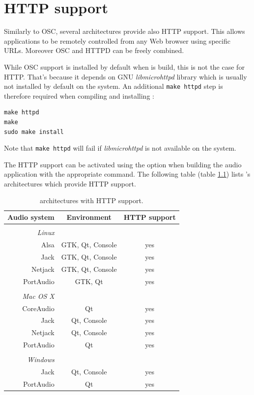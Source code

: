 \chapter{HTTP support} \label{sec:http}

Similarly to OSC, several \faust architectures provide also HTTP support. This allows \faust applications to be remotely controlled from any Web browser using specific URLs. Moreover OSC and HTTPD can be freely combined.

While OSC support is installed by default when \faust is build, this is not the case for HTTP. That's because it depends on GNU \emph{libmicrohttpd} library which is usually not installed by default on the system. An additional \lstinline'make httpd' step is therefore required when compiling and installing \faust:
\begin{lstlisting}
make httpd
make
sudo make install
\end{lstlisting}
Note that \lstinline'make httpd' will fail if \emph{libmicrohttpd} is not available on the system.

The HTTP support can be activated using the  option when building the audio application with the appropriate  command. The following table (table \ref{tab:httparch}) lists \faust's architectures which provide HTTP support. 

\begin{table}[htdp]
\begin{center}
\begin{tabular}{rcc}
\hline
\bf{Audio system} 	& \bf{Environment} & \bf{HTTP support}	\\
\hline
\\
\emph{Linux}\\
Alsa  			& GTK, Qt, Console		& yes\\
Jack 			& GTK, Qt, Console		& yes\\
Netjack 			& GTK, Qt, Console & yes\\
PortAudio 		& GTK, Qt				& yes\\
\\
\emph{Mac OS X} \\
CoreAudio 		& Qt 			& yes\\
Jack 			& Qt, Console & yes\\
Netjack 			& Qt, Console & yes\\
PortAudio 		& Qt 			& yes\\
\\
\emph{Windows} \\
Jack 			& Qt, Console & yes\\
PortAudio 		& Qt 			& yes\\
\hline
\end{tabular}
\end{center}
\caption{\faust architectures with HTTP support.}
\label{tab:httparch}
\end{table}



